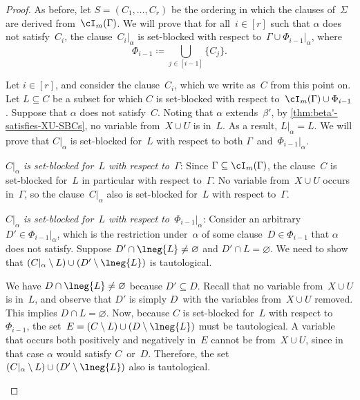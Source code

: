 \documentclass[10pt,a4paper]{article}
\begin{document}
\begin{proof}
  As before, let $S = (C_1, \dots, C_r)$ be the ordering in which
  the clauses of~$\Sigma$ are derived from~$\cI_m(\Gamma)$.
  We will prove that for all~$i \in [r]$
  such that $\alpha$ does not satisfy~$C_i$,
  the clause~$C_i|_\alpha$ is set-blocked
  with respect to~$\Gamma \cup \Phi_{i - 1}|_\alpha$, where
  \begin{equation*}
    \Phi_{i - 1} \coloneqq \bigcup_{j \in [i - 1]} \{C_j\}.
  \end{equation*}

  Let $i \in [r]$, and consider the clause~$C_i$,
  which we write as~$C$ from this point on.
  Let $L \subseteq C$ be a subset for which $C$ is set-blocked
  with respect to~$\cI_m(\Gamma) \cup \Phi_{i - 1}$.
  Suppose that $\alpha$ does not satisfy~$C$.
  Noting that $\alpha$ extends~$\beta'$,
  by \cref{thm:beta'-satisfies-XU-SBCs},
  no variable from~$X \cup U$ is in~$L$.
  As a result, $L|_\alpha = L$.
  We will prove that $C|_\alpha$ is set-blocked for~$L$
  with respect to both $\Gamma$~and~$\Phi_{i - 1}|_\alpha$.

  \begin{description}
  \item\hspace{-\labelsep}\ignorespaces
    \textit{$C|_\alpha$ is set-blocked
      for~$L$ with respect to~$\Gamma$}:
    Since $\Gamma \subseteq \cI_m(\Gamma)$, the clause~$C$
    is set-blocked for~$L$ in particular with respect to~$\Gamma$.
    No variable from~$X \cup U$ occurs in~$\Gamma$,
    so the clause~$C|_\alpha$ also is set-blocked
    for~$L$ with respect to~$\Gamma$.
  \item\hspace{-\labelsep}\ignorespaces
    \textit{$C|_\alpha$ is set-blocked
      for~$L$ with respect to~$\Phi_{i - 1}|_\alpha$}:
    Consider an arbitrary~$D' \in \Phi_{i - 1}|_\alpha$,
    which is the restriction under~$\alpha$
    of some clause~$D \in \Phi_{i - 1}$ that $\alpha$ does not satisfy.
    Suppose $D' \cap \lneg{L} \neq \varnothing$ and $D' \cap L = \varnothing$.
    We need to show that $(C|_\alpha \setminus L)
    \cup (D' \setminus \lneg{L})$ is tautological.

    We have $D \cap \lneg{L} \neq \varnothing$ because $D' \subseteq D$.
    Recall that no variable from~$X \cup U$ is in~$L$,
    and observe that $D'$ is simply $D$~with the variables from~$X \cup U$ removed.
    This implies $D \cap L = \varnothing$.
    Now, because $C$ is set-blocked for~$L$ with respect to~$\Phi_{i - 1}$,
    the set~$E = (C \setminus L) \cup (D \setminus \lneg{L})$ must be tautological.
    A variable that occurs both positively and negatively in~$E$
    cannot be from~$X \cup U$, since in that case $\alpha$ would satisfy $C$~or~$D$.
    Therefore, the set~$(C|_\alpha \setminus L)
    \cup (D' \setminus \lneg{L})$ also is tautological. \qedhere
  \end{description}
\end{proof}
\end{document}

